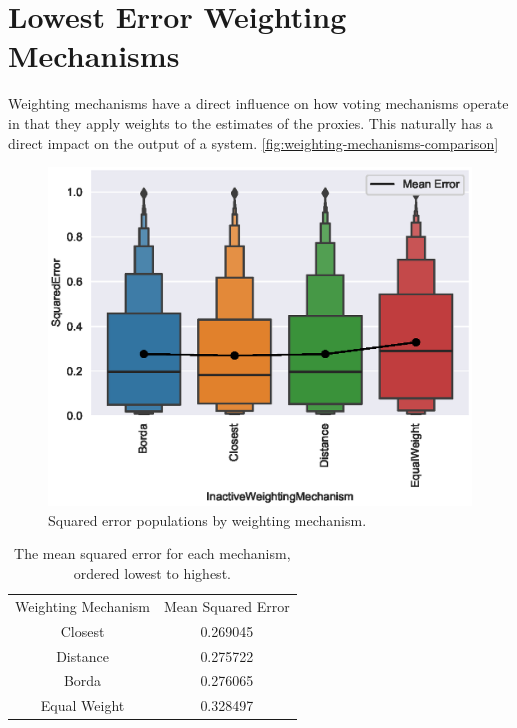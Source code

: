 \section{Lowest Error Weighting Mechanisms}\label{sec:lowest-error-weighting-mechanism}
Weighting mechanisms have a direct influence on how voting mechanisms operate in that
they apply weights to the estimates of the proxies.
This naturally has a direct impact on the output of a system.
\autoref{fig:weighting-mechanisms-comparison}

\begin{figure}[htbp]
    \centering
    \includegraphics[scale=0.75]
    {./content/figures/weighting_mechanisms/weighting_mechanisms_comparison}
    \caption{Squared error populations by weighting mechanism.}
    \label{fig:weighting-mechanisms-comparison}
\end{figure}

\begin{table}[htbp]
    \renewcommand{\arraystretch}{1.0}

    \caption{The mean squared error for each mechanism, ordered lowest to highest.}
    \label{tab:weighting-mechanism-mean-error}

    \centering
    \begin{tabular}{|c|c|}
        \hline
        Weighting Mechanism & Mean Squared Error \\
        \hhline{|=|=|}
        Closest             & 0.269045           \\
        \hline
        Distance            & 0.275722           \\
        \hline
        Borda               & 0.276065           \\
        \hline
        Equal Weight        & 0.328497           \\
        \hline
    \end{tabular}
\end{table}

